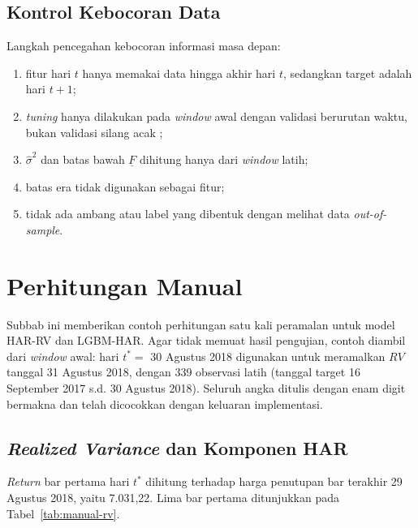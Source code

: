 \subsection{Kontrol Kebocoran Data}
Langkah pencegahan kebocoran informasi masa depan:
\begin{enumerate}
  \item fitur hari $t$ hanya memakai data hingga akhir hari $t$, sedangkan
        target adalah hari $t+1$;
  \item \textit{tuning} hanya dilakukan pada \textit{window} awal dengan
        validasi berurutan waktu, bukan validasi silang acak
        \cite{cerqueira2020};
  \item $\hat\sigma^2$ dan batas bawah $\underline{F}$ dihitung hanya dari
        \textit{window} latih;
  \item batas era tidak digunakan sebagai fitur;
  \item tidak ada ambang atau label yang dibentuk dengan melihat data
        \textit{out-of-sample}.
\end{enumerate}

\section{Perhitungan Manual}
Subbab ini memberikan contoh perhitungan satu kali peramalan untuk model
HAR-RV dan LGBM-HAR. Agar tidak memuat hasil pengujian, contoh diambil dari
\textit{window} awal: hari $t^* = $ 30 Agustus 2018 digunakan untuk meramalkan
$RV$ tanggal 31 Agustus 2018, dengan 339 observasi latih (tanggal target
16 September 2017 s.d. 30 Agustus 2018). Seluruh angka ditulis dengan enam
digit bermakna dan telah dicocokkan dengan keluaran implementasi.

\subsection{\textit{Realized Variance} dan Komponen HAR}
\label{subsec:manual-rv}
\textit{Return} bar pertama hari $t^*$ dihitung terhadap harga penutupan bar
terakhir 29 Agustus 2018, yaitu 7.031,22. Lima bar pertama ditunjukkan pada
Tabel~\ref{tab:manual-rv}.

